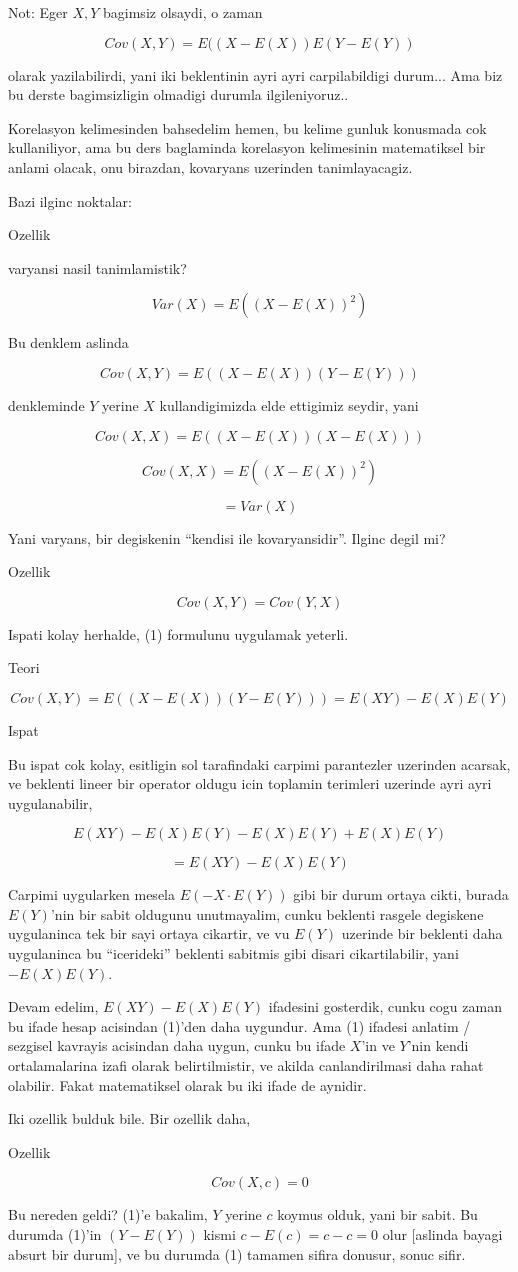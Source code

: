 \documentclass[12pt,fleqn]{article}\usepackage{../common}
\begin{document}
Not: Eger $X,Y$ bagimsiz olsaydi, o zaman 

$$ Cov(X,Y) = E((X-E(X))E(Y-E(Y))  $$

olarak yazilabilirdi, yani iki beklentinin ayri ayri carpilabildigi
durum... Ama biz bu derste bagimsizligin olmadigi durumla ilgileniyoruz..

Korelasyon kelimesinden bahsedelim hemen, bu kelime gunluk konusmada cok
kullaniliyor, ama bu ders baglaminda korelasyon kelimesinin matematiksel
bir anlami olacak, onu birazdan, kovaryans uzerinden tanimlayacagiz.

Bazi ilginc noktalar:

Ozellik 

varyansi nasil tanimlamistik? 

$$ Var(X) = E((X-E(X))^2)  $$

Bu denklem aslinda 

$$ Cov(X,Y) = E((X-E(X))(Y-E(Y)))  $$

denkleminde $Y$ yerine $X$ kullandigimizda elde ettigimiz seydir, yani

$$ Cov(X,X) = E((X-E(X))(X-E(X)))  $$

$$ Cov(X,X) = E((X-E(X))^2)   $$

$$ = Var(X) $$

Yani varyans, bir degiskenin ``kendisi ile kovaryansidir''. Ilginc degil
mi? 

Ozellik

$$ Cov(X,Y) = Cov(Y,X) $$

Ispati kolay herhalde, (1) formulunu uygulamak yeterli.

Teori

$$ Cov(X,Y) = E((X-E(X))(Y-E(Y))) = E(XY) - E(X)E(Y)$$

Ispat

Bu ispat cok kolay, esitligin sol tarafindaki carpimi parantezler uzerinden
acarsak, ve beklenti lineer bir operator oldugu icin toplamin terimleri
uzerinde ayri ayri uygulanabilir, 

$$ E(XY) -E(X)E(Y) -E(X)E(Y) + E(X)E(Y) $$

$$  =  E(XY) - E(X)E(Y) $$

Carpimi uygularken mesela $E(-X \cdot E(Y))$ gibi bir durum ortaya cikti,
burada $E(Y)$'nin bir sabit oldugunu unutmayalim, cunku beklenti rasgele
degiskene uygulaninca tek bir sayi ortaya cikartir, ve vu $E(Y)$ uzerinde
bir beklenti daha uygulaninca bu ``icerideki'' beklenti sabitmis gibi
disari cikartilabilir, yani $-E(X)E(Y)$. 

Devam edelim, $E(XY) - E(X)E(Y)$ ifadesini gosterdik, cunku cogu zaman bu
ifade hesap acisindan (1)'den daha uygundur. Ama (1) ifadesi anlatim /
sezgisel kavrayis acisindan daha uygun, cunku bu ifade $X$'in ve $Y$'nin
kendi ortalamalarina izafi olarak belirtilmistir, ve akilda canlandirilmasi
daha rahat olabilir. Fakat matematiksel olarak bu iki ifade de aynidir. 

Iki ozellik bulduk bile. Bir ozellik daha,

Ozellik

$$ Cov(X,c) = 0 $$

Bu nereden geldi? (1)'e bakalim, $Y$ yerine $c$ koymus olduk, yani bir
sabit. Bu durumda (1)'in $(Y-E(Y))$ kismi $c-E(c)=c-c=0$ olur [aslinda
bayagi absurt bir durum], ve bu durumda (1) tamamen sifira donusur, sonuc sifir.
\end{document}
